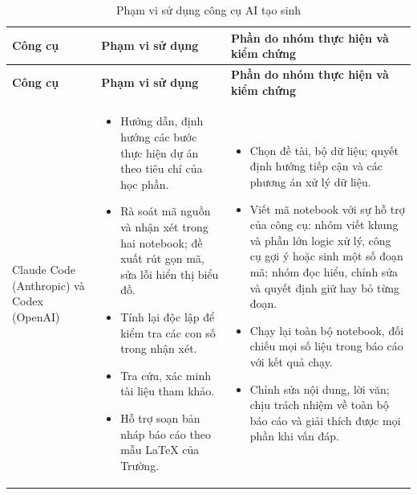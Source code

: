 \documentclass[../main.tex]{subfiles}
\begin{document}
\begin{longtable}{|>{\raggedright\arraybackslash}p{3cm}|>{\raggedright\arraybackslash}p{6.4cm}|>{\raggedright\arraybackslash}p{5cm}|}
\caption{Phạm vi sử dụng công cụ AI tạo sinh}
\label{tab:ai}\\
\hline
\textbf{Công cụ} & \textbf{Phạm vi sử dụng} & \textbf{Phần do nhóm thực hiện và kiểm chứng} \\
\hline
\endfirsthead
\hline
\textbf{Công cụ} & \textbf{Phạm vi sử dụng} & \textbf{Phần do nhóm thực hiện và kiểm chứng} \\
\hline
\endhead
Claude Code (Anthropic) và Codex (OpenAI) & \begin{itemize}[leftmargin=*, nosep]
    \item Hướng dẫn, định hướng các bước thực hiện dự án theo tiêu chí của học phần.
    \item Rà soát mã nguồn và nhận xét trong hai notebook; đề xuất rút gọn mã, sửa lỗi hiển thị biểu đồ.
    \item Tính lại độc lập để kiểm tra các con số trong nhận xét.
    \item Tra cứu, xác minh tài liệu tham khảo.
    \item Hỗ trợ soạn bản nháp báo cáo theo mẫu LaTeX của Trường.
\end{itemize}
& \begin{itemize}[leftmargin=*, nosep]
    \item Chọn đề tài, bộ dữ liệu; quyết định hướng tiếp cận và các phương án xử lý dữ liệu.
    \item Viết mã notebook với sự hỗ trợ của công cụ: nhóm viết khung và phần lớn logic xử lý, công cụ gợi ý hoặc sinh một số đoạn mã; nhóm đọc hiểu, chỉnh sửa và quyết định giữ hay bỏ từng đoạn.
    \item Chạy lại toàn bộ notebook, đối chiếu mọi số liệu trong báo cáo với kết quả chạy.
    \item Chỉnh sửa nội dung, lời văn; chịu trách nhiệm về toàn bộ báo cáo và giải thích được mọi phần khi vấn đáp.
\end{itemize} \\
\hline
\end{longtable}
\end{document}
